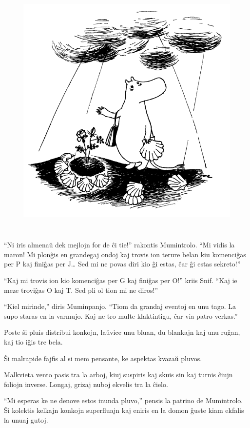 \begin{figure}[htbp]
\centering
\includegraphics[width=359pt,height=371pt]{1-9.png}
\caption{}
\label{1-9}
\end{figure}

``Ni iris almenaŭ dek mejlojn for de ĉi tie!'' rakontis Mumintrolo. ``Mi vidis la maron! Mi plonĝis en grandegaj ondoj kaj trovis ion terure belan kiu komenciĝas per P kaj finiĝas per J{\ldots} Sed mi ne povas diri kio ĝi estas, ĉar ĝi estas sekreto!''

``Kaj mi trovis ion kio komenciĝas per G kaj finiĝas per O!'' kriis Snif. ``Kaj ie meze troviĝas O kaj T. Sed pli ol tion mi ne diros!''

``Kiel mirinde,'' diris Muminpanjo. ``Tiom da grandaj eventoj en unu tago. La supo staras en la varmujo. Kaj ne tro multe klaktintigu, ĉar via patro verkas.''

Poste ŝi pluis distribui konkojn, laŭvice unu bluan, du blankajn kaj unu ruĝan, kaj tio iĝis tre bela.

Ŝi malrapide fajfis al si mem pensante, ke aspektas kvazaŭ pluvos.

Malkvieta vento pasis tra la arboj, kiuj suspiris kaj skuis sin kaj turnis ĉiujn foliojn inverse. Longaj, grizaj nuboj ekvelis tra la ĉielo.

``Mi esperas ke ne denove estos inunda pluvo,'' pensis la patrino de Mumintrolo. Ŝi kolektis kelkajn konkojn superfluajn kaj eniris en la domon ĝuste kiam ekfalis la unuaj gutoj.

